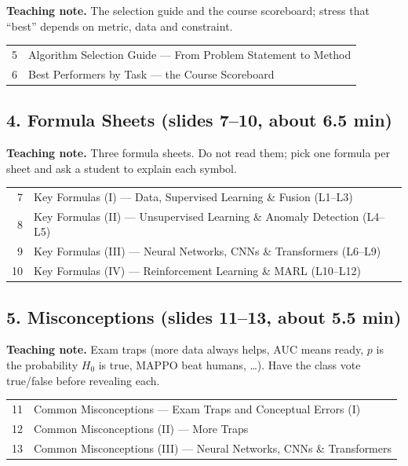 \documentclass[11pt]{article}
\begin{document}
\textbf{Teaching note.} The selection guide and the course scoreboard; stress that ``best'' depends on metric, data and constraint.

\begin{center}\small\renewcommand{\arraystretch}{1.1}\begin{tabularx}{\textwidth}{@{}r X@{}}5 & Algorithm Selection Guide --- From Problem Statement to Method\\
6 & Best Performers by Task --- the Course Scoreboard\\\end{tabularx}\end{center}

\subsection{4. Formula Sheets \normalfont\small\color{GreyN}(slides 7--10, about 6.5 min)}

\textbf{Teaching note.} Three formula sheets. Do not read them; pick one formula per sheet and ask a student to explain each symbol.

\begin{center}\small\renewcommand{\arraystretch}{1.1}\begin{tabularx}{\textwidth}{@{}r X@{}}7 & Key Formulas (I) --- Data, Supervised Learning \& Fusion (L1--L3)\\
8 & Key Formulas (II) --- Unsupervised Learning \& Anomaly Detection (L4--L5)\\
9 & Key Formulas (III) --- Neural Networks, CNNs \& Transformers (L6--L9)\\
10 & Key Formulas (IV) --- Reinforcement Learning \& MARL (L10--L12)\\\end{tabularx}\end{center}

\subsection{5. Misconceptions \normalfont\small\color{GreyN}(slides 11--13, about 5.5 min)}

\textbf{Teaching note.} Exam traps (more data always helps, AUC means ready, $p$ is the probability $H_0$ is true, MAPPO beat humans, \ldots). Have the class vote true/false before revealing each.

\begin{center}\small\renewcommand{\arraystretch}{1.1}\begin{tabularx}{\textwidth}{@{}r X@{}}11 & Common Misconceptions --- Exam Traps and Conceptual Errors (I)\\
12 & Common Misconceptions (II) --- More Traps\\
13 & Common Misconceptions (III) --- Neural Networks, CNNs \& Transformers\\\end{tabularx}\end{center}
\end{document}
